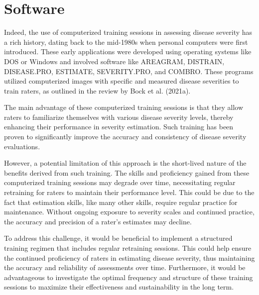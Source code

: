 \documentclass[
  letterpaper,
]{book}
\begin{document}
\hypertarget{software-1}{%
\section{Software}\label{software-1}}

Indeed, the use of computerized training sessions in assessing disease
severity has a rich history, dating back to the mid-1980s when personal
computers were first introduced. These early applications were developed
using operating systems like DOS or Windows and involved software like
AREAGRAM, DISTRAIN, DISEASE.PRO, ESTIMATE, SEVERITY.PRO, and COMBRO.
These programs utilized computerized images with specific and measured
disease severities to train raters, as outlined in the review by Bock et
al. (2021a).

The main advantage of these computerized training sessions is that they
allow raters to familiarize themselves with various disease severity
levels, thereby enhancing their performance in severity estimation. Such
training has been proven to significantly improve the accuracy and
consistency of disease severity evaluations.

However, a potential limitation of this approach is the short-lived
nature of the benefits derived from such training. The skills and
proficiency gained from these computerized training sessions may degrade
over time, necessitating regular retraining for raters to maintain their
performance level. This could be due to the fact that estimation skills,
like many other skills, require regular practice for maintenance.
Without ongoing exposure to severity scales and continued practice, the
accuracy and precision of a rater's estimates may decline.

To address this challenge, it would be beneficial to implement a
structured training regimen that includes regular retraining sessions.
This could help ensure the continued proficiency of raters in estimating
disease severity, thus maintaining the accuracy and reliability of
assessments over time. Furthermore, it would be advantageous to
investigate the optimal frequency and structure of these training
sessions to maximize their effectiveness and sustainability in the long
term.
\end{document}

